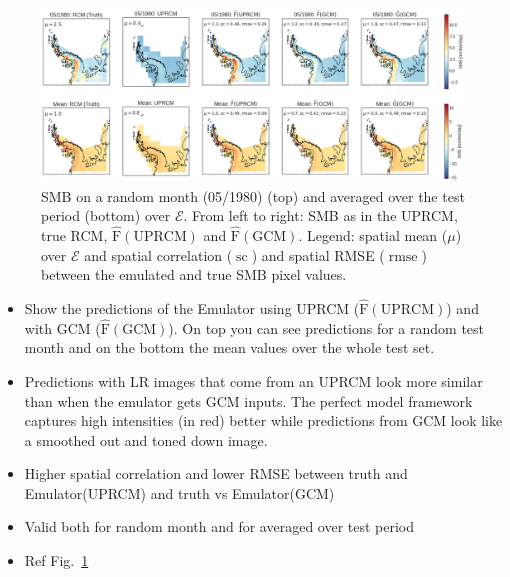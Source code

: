 \documentclass[a4paper,11pt,oneside]{report}
\begin{document}
\begin{figure}[thb]
  \centering
  \includegraphics[width=\columnwidth]{doc/Thesis-latex/images/results/geoplots_RCM_GCM.png}
  \caption []{\small SMB on a random month (05/1980) (top) and averaged over the test period (bottom) over $\mathcal{E}$. From left to right: SMB as in the UPRCM, true RCM, $\operatorname{\hat{F}(UPRCM)}$ and $\operatorname{\hat{F}(GCM)}$. Legend: spatial mean ($\mu$) over $\mathcal{E}$ and spatial correlation ($\operatorname{sc}$) and spatial RMSE ($\operatorname{rmse}$) between the emulated and true SMB pixel values.}
  \vspace{-3mm}
  \label{fig:geoplots-GCM-RCM}
\end{figure}

\begin{itemize}
    \item Show the predictions of the Emulator using UPRCM ($\operatorname{\hat{F}(UPRCM)}$) and with GCM ($\operatorname{\hat{F}(GCM)}$). On top you can see predictions for a random test month and on the bottom the mean values over the whole test set. 
    \item Predictions with LR images that come from an UPRCM look more similar than when the emulator gets GCM inputs. The perfect model framework captures high intensities (in red) better while predictions from GCM look like a smoothed out and toned down image.
    \item Higher spatial correlation and lower RMSE between truth and Emulator(UPRCM) and truth vs Emulator(GCM)
    \item Valid both for random month and for averaged over test period
    \item Ref Fig.~\ref{fig:geoplots-GCM-RCM}
\end{itemize}
\end{document}
